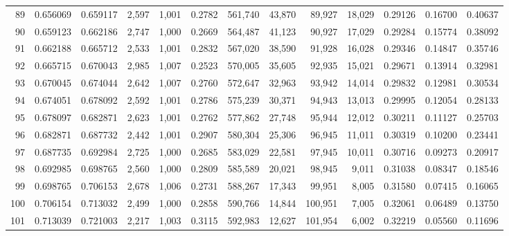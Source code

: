 \begin{tabular}{rrrrrrrrrrrrr}
89  &  0.656069 &  0.659117 &   2,597 &  1,001 &                                     0.2782 &  561,740 &   43,870 &   89,927 &   18,029 &  0.29126 &  0.16700 &  0.40637 \\
90  &  0.659123 &  0.662186 &   2,747 &  1,000 &                                     0.2669 &  564,487 &   41,123 &   90,927 &   17,029 &  0.29284 &  0.15774 &  0.38092 \\
91  &  0.662188 &  0.665712 &   2,533 &  1,001 &                                     0.2832 &  567,020 &   38,590 &   91,928 &   16,028 &  0.29346 &  0.14847 &  0.35746 \\
92  &  0.665715 &  0.670043 &   2,985 &  1,007 &                                     0.2523 &  570,005 &   35,605 &   92,935 &   15,021 &  0.29671 &  0.13914 &  0.32981 \\
93  &  0.670045 &  0.674044 &   2,642 &  1,007 &                                     0.2760 &  572,647 &   32,963 &   93,942 &   14,014 &  0.29832 &  0.12981 &  0.30534 \\
94  &  0.674051 &  0.678092 &   2,592 &  1,001 &                                     0.2786 &  575,239 &   30,371 &   94,943 &   13,013 &  0.29995 &  0.12054 &  0.28133 \\
95  &  0.678097 &  0.682871 &   2,623 &  1,001 &                                     0.2762 &  577,862 &   27,748 &   95,944 &   12,012 &  0.30211 &  0.11127 &  0.25703 \\
96  &  0.682871 &  0.687732 &   2,442 &  1,001 &                                     0.2907 &  580,304 &   25,306 &   96,945 &   11,011 &  0.30319 &  0.10200 &  0.23441 \\
97  &  0.687735 &  0.692984 &   2,725 &  1,000 &                                     0.2685 &  583,029 &   22,581 &   97,945 &   10,011 &  0.30716 &  0.09273 &  0.20917 \\
98  &  0.692985 &  0.698765 &   2,560 &  1,000 &                                     0.2809 &  585,589 &   20,021 &   98,945 &    9,011 &  0.31038 &  0.08347 &  0.18546 \\
99  &  0.698765 &  0.706153 &   2,678 &  1,006 &                                     0.2731 &  588,267 &   17,343 &   99,951 &    8,005 &  0.31580 &  0.07415 &  0.16065 \\
100 &  0.706154 &  0.713032 &   2,499 &  1,000 &                                     0.2858 &  590,766 &   14,844 &  100,951 &    7,005 &  0.32061 &  0.06489 &  0.13750 \\
101 &  0.713039 &  0.721003 &   2,217 &  1,003 &                                     0.3115 &  592,983 &   12,627 &  101,954 &    6,002 &  0.32219 &  0.05560 &  0.11696 \\

\end{tabular}
